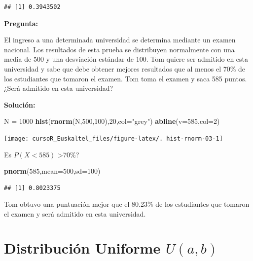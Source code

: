 \documentclass[]{book}
\newenvironment{Shaded}{\begin{snugshade}}{\end{snugshade}}
\newcommand{\KeywordTok}[1]{\textcolor[rgb]{0.13,0.29,0.53}{\textbf{#1}}}
\newcommand{\DataTypeTok}[1]{\textcolor[rgb]{0.13,0.29,0.53}{#1}}
\newcommand{\DecValTok}[1]{\textcolor[rgb]{0.00,0.00,0.81}{#1}}
\newcommand{\StringTok}[1]{\textcolor[rgb]{0.31,0.60,0.02}{#1}}
\newcommand{\NormalTok}[1]{#1}
\begin{document}
\begin{verbatim}
## [1] 0.3943502
\end{verbatim}

\textbf{Pregunta:}

El ingreso a una determinada universidad se determina mediante un examen
nacional. Los resultados de esta prueba se distribuyen normalmente con
una media de 500 y una desviación estándar de 100. Tom quiere ser
admitido en esta universidad y sabe que debe obtener mejores resultados
que al menos el 70\% de los estudiantes que tomaron el examen. Tom toma
el examen y saca 585 puntos. ¿Será admitido en esta universidad?

\textbf{Solución:}

\begin{Shaded}
\begin{Highlighting}[]
\NormalTok{N =}\StringTok{ }\DecValTok{1000}
\KeywordTok{hist}\NormalTok{(}\KeywordTok{rnorm}\NormalTok{(N,}\DecValTok{500}\NormalTok{,}\DecValTok{100}\NormalTok{),}\DecValTok{20}\NormalTok{,}\DataTypeTok{col=}\StringTok{"grey"}\NormalTok{)}
\KeywordTok{abline}\NormalTok{(}\DataTypeTok{v=}\DecValTok{585}\NormalTok{,}\DataTypeTok{col=}\DecValTok{2}\NormalTok{)}
\end{Highlighting}
\end{Shaded}

\begin{center}\texttt{[image: cursoR\_Euskaltel\_files/figure-latex/. hist-rnorm-03-1]} \end{center}

Es \(P(X<585)\) \textgreater{}70\%?

\begin{Shaded}
\begin{Highlighting}[]
\KeywordTok{pnorm}\NormalTok{(}\DecValTok{585}\NormalTok{,}\DataTypeTok{mean=}\DecValTok{500}\NormalTok{,}\DataTypeTok{sd=}\DecValTok{100}\NormalTok{)}
\end{Highlighting}
\end{Shaded}

\begin{verbatim}
## [1] 0.8023375
\end{verbatim}

Tom obtuvo una puntuación mejor que el 80.23\% de los estudiantes que
tomaron el examen y será admitido en esta universidad.

\section{\texorpdfstring{Distribución Uniforme
\(U(a,b)\)}{Distribución Uniforme U(a,b)}}\label{distribucion-uniforme-uab}
\end{document}
